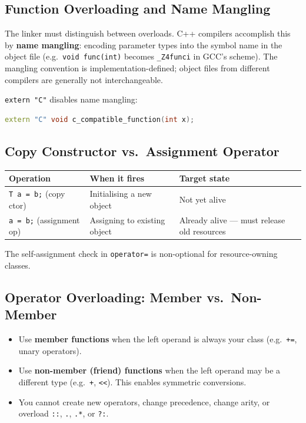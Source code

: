 \subsection{Function Overloading and Name Mangling}

The linker must distinguish between overloads. C++ compilers accomplish this by \textbf{name mangling}: encoding parameter types into the symbol name in the object file (e.g.\ \texttt{void func(int)} becomes \texttt{\_Z4funci} in GCC's scheme). The mangling convention is implementation-defined; object files from different compilers are generally not interchangeable.

\texttt{extern "C"} disables name mangling:

\begin{lstlisting}[language=C++, caption={extern "C" for C linkage}]
extern "C" void c_compatible_function(int x);
\end{lstlisting}

\subsection{Copy Constructor vs.\ Assignment Operator}

\begin{center}
\begin{tabular}{|l|l|l|}
\hline
\textbf{Operation} & \textbf{When it fires} & \textbf{Target state} \\
\hline
\texttt{T a = b;} (copy ctor)   & Initialising a new object     & Not yet alive \\
\texttt{a = b;} (assignment op) & Assigning to existing object  & Already alive --- must release old resources \\
\hline
\end{tabular}
\end{center}

The self-assignment check in \texttt{operator=} is non-optional for resource-owning classes.

\subsection{Operator Overloading: Member vs.\ Non-Member}

\begin{itemize}
    \item Use \textbf{member functions} when the left operand is always your class (e.g.\ \texttt{+=}, unary operators).
    \item Use \textbf{non-member (friend) functions} when the left operand may be a different type (e.g.\ \texttt{+}, \texttt{<<}). This enables symmetric conversions.
    \item You cannot create new operators, change precedence, change arity, or overload \texttt{::}, \texttt{.}, \texttt{.*}, or \texttt{?:}.
\end{itemize}

